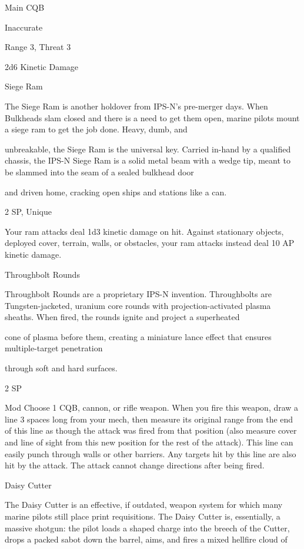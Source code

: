 Main CQB
 
Inaccurate
 
Range 3, Threat 3
 
2d6 Kinetic Damage
 

Siege Ram  

The Siege Ram is another holdover from IPS-N’s pre-merger days. When Bulkheads slam closed and there  
is a need to get them open, marine pilots mount a siege ram to get the job done. Heavy, dumb, and  

unbreakable, the Siege Ram is the universal key. Carried in-hand by a qualified chassis, the IPS-N Siege  
Ram is a solid metal beam with a wedge tip, meant to be slammed into the seam of a sealed bulkhead door  

and driven home, cracking open ships and stations like a can.    

2 SP, Unique
 

                                                                                                                          


Your ram attacks deal 1d3 kinetic damage on hit. Against stationary objects, deployed cover,  
terrain, walls, or obstacles, your ram attacks instead deal 10 AP kinetic damage.
 

Throughbolt Rounds  

Throughbolt Rounds are a proprietary IPS-N invention. Throughbolts are Tungsten-jacketed, uranium core  
rounds with projection-activated plasma sheaths. When fired, the rounds ignite and project a superheated  

cone of plasma before them, creating a miniature lance effect that ensures multiple-target penetration  

through soft and hard surfaces.    

2 SP  

Mod  
Choose 1 CQB, cannon, or rifle weapon. When you fire this weapon, draw a line 3 spaces long  
from your mech, then measure its original range from the end of this line as though the attack  
was fired from that position (also measure cover and line of sight from this new position for the  
rest of the attack). This line can easily punch through walls or other barriers. Any targets hit by  
this line are also hit by the attack. The attack cannot change directions after being fired.
 

Daisy Cutter  

The Daisy Cutter is an effective, if outdated, weapon system for which many marine pilots still place print  
requisitions. The Daisy Cutter is, essentially, a massive shotgun: the pilot loads a shaped charge into the  
breech of the Cutter, drops a packed sabot down the barrel, aims, and fires a mixed hellfire cloud of  


